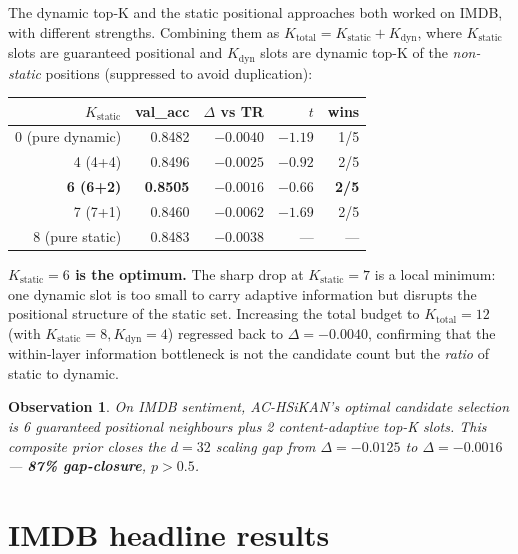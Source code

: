 \documentclass[10pt,a4paper]{article}
\newtheorem{observation}{Observation}
\begin{document}
The dynamic top-K and the static positional approaches both worked
on IMDB, with different strengths. Combining them as $K_{\text{total}}
= K_{\text{static}} + K_{\text{dyn}}$, where $K_{\text{static}}$ slots
are guaranteed positional and $K_{\text{dyn}}$ slots are dynamic top-K
of the \emph{non-static} positions (suppressed to avoid duplication):

\begin{center}
\begin{tabular}{rrrrr}
\toprule
$K_{\text{static}}$ & val\_acc & $\Delta$ vs TR & $t$ & wins \\
\midrule
0 (pure dynamic)  & 0.8482 & $-0.0040$ & $-1.19$ & 1/5 \\
4 (4+4)           & 0.8496 & $-0.0025$ & $-0.92$ & 2/5 \\
\textbf{6 (6+2)}  & \textbf{0.8505} & \textbf{$-0.0016$} & \textbf{$-0.66$} & \textbf{2/5} \\
7 (7+1)           & 0.8460 & $-0.0062$ & $-1.69$ & 2/5 \\
8 (pure static)   & 0.8483 & $-0.0038$ & ---     & --- \\
\bottomrule
\end{tabular}
\end{center}

\textbf{$K_{\text{static}} = 6$ is the optimum.} The sharp drop at
$K_{\text{static}} = 7$ is a local minimum: one dynamic slot is too
small to carry adaptive information but disrupts the positional
structure of the static set. Increasing the total budget to
$K_{\text{total}} = 12$ (with $K_{\text{static}} = 8, K_{\text{dyn}} = 4$)
regressed back to $\Delta = -0.0040$, confirming that the
within-layer information bottleneck is not the candidate count but the
\emph{ratio} of static to dynamic.

\begin{observation}
On IMDB sentiment, AC-HSiKAN's optimal candidate selection is 6
guaranteed positional neighbours plus 2 content-adaptive top-K
slots. This composite prior closes the $d=32$ scaling gap from
$\Delta = -0.0125$ to $\Delta = -0.0016$ --- \textbf{87\% gap-closure},
$p > 0.5$.
\end{observation}

\section{IMDB headline results}
\label{sec:imdb}
\end{document}
